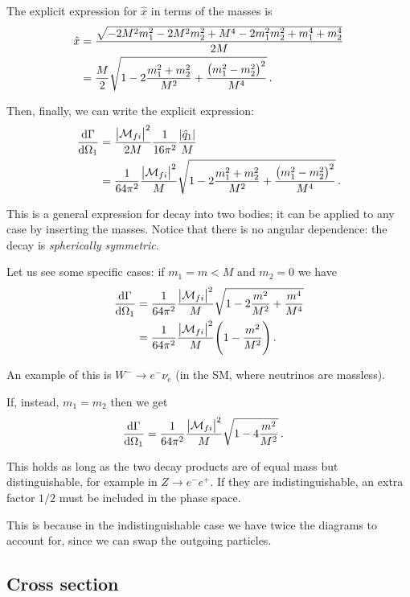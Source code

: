 \documentclass[main.tex]{subfiles}
\begin{document}
The explicit expression for \(\hat{x}\) in terms of the masses is 
%
\begin{align}
\hat{x} &= \frac{\sqrt{-2 M^2 m_1^2-2 M^2 m_2^2+M^4-2 m_1^2 m_2^2+m_1^4+m_2^4}}{2 M}  \\
&= \frac{M}{2} \sqrt{1 -2\frac{m_1^2+m_2^2}{M^2}+ \frac{\qty(m_1^2-m_2^2)^2}{M^{4}}}
\,.
\end{align}

Then, finally, we can write the explicit expression: 
%
\begin{align}
\dv{\Gamma }{\Omega_1 } 
&= \frac{\abs{\mathcal{M}_{fi}}^2}{2M}
\frac{1}{16 \pi^2}
\frac{\abs{\hat{q}_{1}}}{M}  \\
&= \frac{1}{64 \pi^2}
\frac{\abs{\mathcal{M}_{fi}}^2}{M}
\sqrt{1 -2\frac{m_1^2+m_2^2}{M^2}+ \frac{\qty(m_1^2-m_2^2)^2}{M^{4}}}
\,.
\end{align}

This is a general expression for decay into two bodies; it can be applied to any case by inserting the masses. 
Notice that there is no angular dependence: the decay is \emph{spherically symmetric}. 

Let us see some specific cases: if \(m_1 = m < M\) and \(m_2 = 0\) we have 
%
\begin{align}
\dv{\Gamma }{\Omega_1 } &= \frac{1}{64 \pi^2}
\frac{\abs{\mathcal{M}_{fi}}^2}{M}
\sqrt{1 - 2\frac{m^2}{M^2} + \frac{m^4}{M^{4}}}  \\
&= \frac{1}{64 \pi^2}
\frac{\abs{\mathcal{M}_{fi}}^2}{M}
\qty(1 - \frac{m^2}{M^2})
\,.
\end{align}

An example of this is \(W^{-} \to e^{-} \nu_{e}\) (in the SM, where neutrinos are massless).

If, instead, \(m_1 = m_2 \) then we get 
%
\begin{align} \label{eq:differential-decay-rate-equal-masses}
\dv{\Gamma }{\Omega_1 } &= \frac{1}{64 \pi^2}
\frac{\abs{\mathcal{M}_{fi}}^2}{M}
\sqrt{1 - 4\frac{m^2}{M^2}}
\,.
\end{align}

This holds as long as the two decay products are of equal mass but distinguishable, for example in \(Z \to e^{-} e^{+}\). 
If they are indistinguishable, an extra factor \(1/2\) must be included in the phase space.

This is because in the indistinguishable case we have twice the diagrams to account for, since we can swap the outgoing particles.

\subsection{Cross section}
\end{document}
